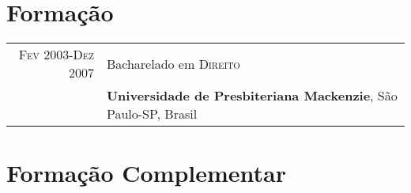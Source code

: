\documentclass[a4paper,10pt]{article} %
\begin{document}

\section{Formação}

\begin{tabular}{r|p{11cm}}
\textsc{Fev} 2003-\textsc{Dez} 2007& Bacharelado em \textsc{}\textsc{Direito} \\& \normalsize\textbf{Universidade de Presbiteriana Mackenzie}, São Paulo-SP, Brasil\\

\end{tabular}

\section{Formação Complementar}
\end{document}

